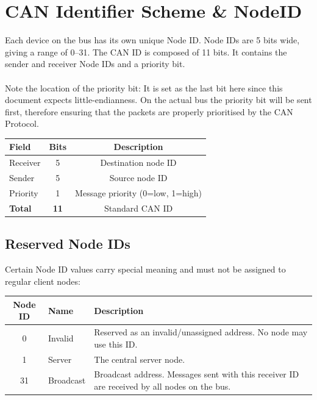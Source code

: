 \section{CAN Identifier Scheme \& NodeID}\label{sec:can-id-scheme}
Each device on the bus has its own unique Node ID. Node IDs are 5 bits wide, giving a range of 0--31.
The CAN ID is composed of 11 bits. It contains the sender and receiver Node IDs and a priority bit.

\paragraph{}
Note the location of the priority bit: It is set as the last bit here since 
this document expects little-endianness. On the actual bus the priority bit will be sent first, therefore ensuring that the packets are properly prioritised by the CAN Protocol.


\begin{center}
\begin{tabular}{l c c}
\toprule
Field & Bits & Description \\
\midrule
Receiver & 5 & Destination node ID \\
Sender & 5 & Source node ID \\
Priority & 1 & Message priority (0=low, 1=high) \\
\midrule
\textbf{Total} & \textbf{11} & Standard CAN ID \\
\bottomrule
\end{tabular}

\end{center}

\subsection{Reserved Node IDs}\label{sec:reserved-node-ids}
Certain Node ID values carry special meaning and must not be assigned to regular client nodes:

\begin{center}
\begin{tabular}{c l p{8cm}}
\toprule
\textbf{Node ID} & \textbf{Name} & \textbf{Description} \\
\midrule
0  & Invalid   & Reserved as an invalid/unassigned address. No node may use this ID. \\
1  & Server    & The central server node. \\
31 & Broadcast & Broadcast address. Messages sent with this receiver ID are received by all nodes on the bus. \\
\bottomrule
\end{tabular}
\end{center}

